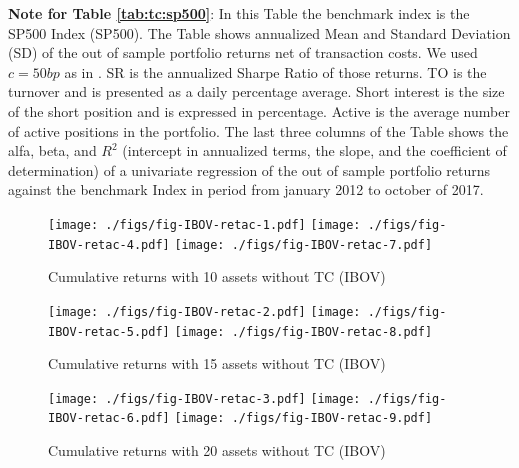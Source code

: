 \documentclass[preprint,authoryear,review,12pt]{elsarticle}
\begin{document}
\begin{singlespace}
{\footnotesize
\textbf{Note for Table \ref{tab:tc:sp500}}:
In this Table the benchmark index is the SP500 Index (SP500).
The Table shows annualized Mean and Standard Deviation (SD) of the out of sample portfolio returns net of transaction costs.
We used $c=50bp$ as in \cite{dgu2009}.
SR is the annualized Sharpe Ratio of those returns.
TO is the turnover and is presented as a daily percentage average.
Short interest is the size of the short position and is expressed in percentage.
Active is the average number of active positions in the portfolio.
The last three columns of the Table shows the alfa, beta, and $R^2$ (intercept in annualized terms, the slope, and the coefficient of determination) of a univariate regression of the out of sample portfolio returns against the benchmark Index in period from january 2012 to october of 2017.}
\end{singlespace}

\clearpage

\begin{figure}[htpb]
\centering
\caption{Cumulative returns with 10 assets without TC (IBOV)}
\label{fig:ibov:ret:10a}
\texttt{[image: ./figs/fig-IBOV-retac-1.pdf]}
\texttt{[image: ./figs/fig-IBOV-retac-4.pdf]}
\texttt{[image: ./figs/fig-IBOV-retac-7.pdf]}

\end{figure}

\begin{figure}[htpb]
\centering
\caption{Cumulative returns with 15 assets without TC (IBOV)}
\label{fig:ibov:ret:15a}
\texttt{[image: ./figs/fig-IBOV-retac-2.pdf]}
\texttt{[image: ./figs/fig-IBOV-retac-5.pdf]}
\texttt{[image: ./figs/fig-IBOV-retac-8.pdf]}
\end{figure}

\begin{figure}[htpb]
\centering
\caption{Cumulative returns with 20 assets without TC (IBOV)}
\label{fig:ibov:ret:20a}
\texttt{[image: ./figs/fig-IBOV-retac-3.pdf]}
\texttt{[image: ./figs/fig-IBOV-retac-6.pdf]}
\texttt{[image: ./figs/fig-IBOV-retac-9.pdf]}
\end{figure}
\end{document}
